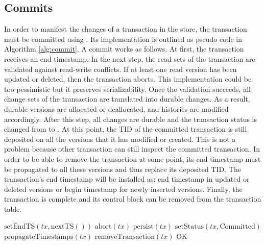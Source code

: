 \subsection{Commits}

In order to manifest the changes of a transaction in the store, the transaction must be committed using . Its implementation is outlined as pseudo code in Algorithm \ref{alg:commit}. A commit works as follows. At first, the transaction receives an end timestamp. In the next step, the read sets of the transaction are validated against read-write conflicts. If at least one read version has been updated or deleted, then the transaction aborts. This implementation could be too pessimistic but it preserves serializability. Once the validation succeeds, all change sets of the transaction are translated into durable changes. As a result, durable versions are allocated or deallocated, and histories are modified accordingly. After this step, all changes are durable and the transaction status is changed from  to . At this point, the TID of the committed transaction is still deposited on all the versions that it has modified or created. This is not a problem because other transaction can still inspect the committed transaction. In order to be able to remove the transaction at some point, its end timestamp must be propagated to all these versions and thus replace its deposited TID.
The transaction's end timestamp will be installed as: end timestamp in updated or deleted versions or begin timestamp for newly inserted versions. Finally, the transaction is complete and its control block can be removed from the transaction table.

\begin{algorithm}
\begin{algorithmic}[1]
\State $\text{setEndTS}(\textit{tx}, \text{nextTS}())$
\State \Return $\text{abort}(\textit{tx})$
\EndIf
\State $\text{persist}(\textit{tx})$
\State $\text{setStatus}(\textit{tx}, \text{Committed})$
\State $\text{propagateTimestamps}(\textit{tx})$
\State $\text{removeTransaction}(\textit{tx})$
\State \Return $\text{OK}$
\EndProcedure
\end{algorithmic}
\caption{}
\label{alg:commit}
\end{algorithm}
